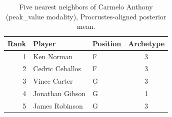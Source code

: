 \begin{table}[htbp]
  \centering\small
  \begin{tabular}{rllc}
    \toprule
    Rank & Player & Position & Archetype \\
    \midrule
    1 & Ken Norman & F & 3 \\
    2 & Cedric Ceballos & F & 3 \\
    3 & Vince Carter & G & 3 \\
    4 & Jonathan Gibson & G & 1 \\
    5 & James Robinson & G & 3 \\
    \bottomrule
  \end{tabular}
  \caption{Five nearest neighbors of Carmelo Anthony (peak_value modality), Procrustes-aligned posterior mean.}
  \label{tab:Carmelo_Anthony_neighbors_peak_value}
\end{table}


